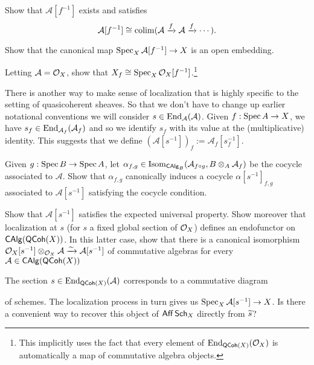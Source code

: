 \documentclass[11pt]{article}
\renewcommand{\AA}{\mathcal{A}}
\begin{document}
\begin{exercise}
\hfill
\begin{enum}{\alph}
\item Show that $\AA[f^{-1}]$ exists and satisfies 
$$\AA[f^{-1}]\iso\colim(\AA\xto{f}\AA\xto{f}\cdots).$$

\item Show that the canonical map $\Spec_X\AA[f^{-1}]\to X$ is an open embedding.

\item Letting $\AA=\O_X$, show that $X_f\cong\operatorname{Spec}_X\mathcal{O}_X[f^{-1}]$.\footnote{This implicitly uses the fact that every element of $\operatorname{End}_{\operatorname{\mathsf{QCoh}}(X)}(\mathcal{O}_X)$ is automatically a map of commutative algebra objects.}
\end{enum}
\end{exercise}

There is another way to make sense of localization that is highly specific to the setting of quasicoherent sheaves. So that we don't have to change up earlier notational conventions we will consider $s\in\End_{\AA}(\AA)$. Given $f: \operatorname{Spec} A\to X$, we have $s_f\in\End_{\AA_f}(\AA_f)$ and so we identify $s_f$ with its value at the (multiplicative) identity. This suggests that we define $(\AA[s^{-1}])_f:=\AA_f[s_f^{-1}]$.

\begin{exercise}
Given $g:\operatorname{Spec} B\to\operatorname{Spec} A$, let $\alpha_{f,g}\in\Isom_{\CAlg_B}(\AA_{f\circ g},B\tensor_A\AA_f)$ be the cocycle associated to $\AA$. Show that $\alpha_{f,g}$ canonically induces a cocycle $\alpha[s^{-1}]_{f,g}$ associated to $\AA[s^{-1}]$ satisfying the cocycle condition.
\end{exercise}

\begin{exercise}
Show that $\AA[s^{-1}]$ satisfies the expected universal property. Show moreover that localization at $s$ (for $s$ a fixed global section of $\mathcal{O}_X$) defines an endofunctor on $\operatorname{\mathsf{CAlg}}(\operatorname{\mathsf{QCoh}}(X))$. In this latter case, show that there is a canonical isomorphism $\O_X[s^{-1}]\tensor_{\O_X}\AA\xto{\sim}\AA[s^{-1}]$ of commutative algebras for every $\AA\in\CAlg(\QCoh(X))$
\end{exercise}

\begin{exercise}
The section $s\in\End_{\QCoh(X)}(\AA)$ corresponds to a commutative diagram
\begin{center}
\end{center}
of schemes. The localization process in turn gives us $\Spec_X\AA[s^{-1}]\to X$. Is there a convenient way to recover this object of $\operatorname{\mathsf{Aff}}\operatorname{\mathsf{Sch}}_X$ directly from $\widetilde{s}$?
\end{exercise}
\end{document}
